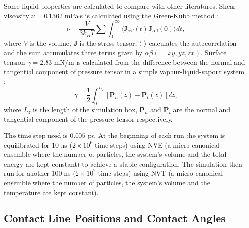 \documentclass[
reprint,
 amsmath,amssymb,
 aps,
url
]{revtex4-1}
\begin{document}
Some liquid properties are calculated to compare with other literatures. Shear viscosity $\nu=0.1362$ mPa$\cdot$s is calculated using the Green-Kubo method \cite{haile_molecular_1993}:
\begin{equation}
	\nu = \frac{V}{3k_B T}\sum\int_0^{\infty}\langle \mathbf{J}_{\alpha\beta}(t)\mathbf{J}_{\alpha\beta}(0)\rangle dt,
\end{equation}
where $V$ is the volume, $\mathbf{J}$ is the stress tensor, $\langle$ $\rangle$ calculates the autocorrelation and the sum accumulates three terms given by $\alpha\beta(=xy,yz,zx)$. Surface tension $\gamma = 2.83$ mN/m is calculated from the difference between the normal and tangential component of pressure tensor in a simple vapour-liquid-vapour system \cite{trokhymchuk_computer_1999}:
\begin{equation}
	\gamma = \frac{1}{2}\int_0^{L_z}[\mathbf{P}_n(z)-\mathbf{P}_t(z)]dz,
\end{equation} 
where $L_z$ is the length of the simulation box, $\mathbf{P}_n$ and $\mathbf{P}_t$ are the normal and tangential component of the pressure tensor respectively. 

The time step used is $0.005$ ps. At the beginning of each run the system is equilibrated for $10$ ns ($2\times10^6$ time steps) using NVE (a micro-canonical ensemble where the number of particles, the system's volume and the total energy are kept constant) to achieve a stable configuration. The simulation then run for another $100$ ns ($2\times 10^7$ time steps) using NVT (a micro-canonical ensemble where the number of particles, the system's volume and the temperature are kept constant).

\subsection{Contact Line Positions and Contact Angles}
\end{document}
